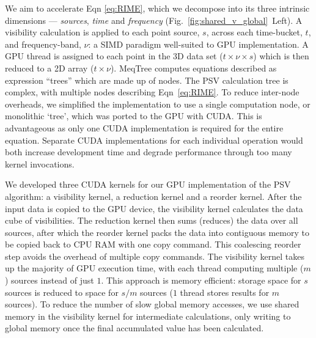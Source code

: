 We aim to accelerate Eqn \ref{eq:RIME}, which we  decompose into its three intrinsic dimensions --- \emph{sources}, \emph{time} and \emph{frequency} (Fig.~\ref{fig:shared_v_global}~Left). A visibility calculation is applied to each point source, $s$, across each time-bucket, $t$, and frequency-band, $\nu$: a SIMD paradigm well-suited to GPU implementation.  A GPU thread is assigned to each point in the 3D data set ($t\times \nu \times s$) which is then reduced to a 2D array ($t\times \nu$). MeqTree computes equations described as expression ``trees'' which are made up of nodes. The PSV calculation tree is complex,  with multiple nodes  describing Eqn~\ref{eq:RIME}.  To reduce inter-node overheads, we simplified the implementation to use a single computation node, or monolithic `tree', which was ported to the GPU with CUDA. This is advantageous as only one CUDA implementation is required for the entire equation. Separate CUDA implementations for each individual operation would both increase development time and degrade performance through too many kernel invocations.

We developed three CUDA kernels for our GPU implementation of the PSV algorithm: a visibility kernel, a reduction kernel and a reorder kernel. After the input data is copied to the GPU device, the visibility kernel calculates the data cube of visibilities.  The reduction kernel then sums (reduces) the data over all sources, after which the reorder kernel packs the data into contiguous memory to be copied back to CPU RAM with one copy command. This coalescing reorder step avoids the overhead of multiple copy commands. The visibility kernel takes up the majority of GPU execution time, with each thread computing multiple ($m$) sources instead of just $1$. This approach is memory efficient: storage space for $s$ sources is reduced to space for $s/m$ sources ($1$ thread stores results for $m$ sources). To reduce the number of slow global memory accesses, we use shared memory in the visibility kernel for intermediate calculations, only writing to global memory once the final accumulated value has been calculated.

